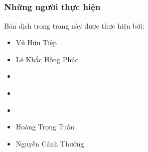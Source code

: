 \documentclass[letterpaper,11pt,english]{sphinxmanual}
\begin{document}
\subsection{}
\label{\detokenize{chapter_appendix_math/geometry-linear-algebric-ops_vn:id2}}


\begin{figure}[H]
\centering
\capstart

\noindent{}
\caption{}\label{\detokenize{chapter_appendix_math/geometry-linear-algebric-ops_vn:id12}}\end{figure}




\subsubsection{Những người thực hiện}
\label{\detokenize{chapter_appendix_math/geometry-linear-algebric-ops_vn:nhung-nguoi-thuc-hien}}
Bản dịch trong trang này được thực hiện bởi:


\begin{itemize}
\item {} 
Vũ Hữu Tiệp

\end{itemize}


\begin{itemize}
\item {} 
Lê Khắc Hồng Phúc

\end{itemize}


\begin{itemize}
\item {} 
\end{itemize}


\begin{itemize}
\item {} 
\end{itemize}


\begin{itemize}
\item {} 
\end{itemize}


\begin{itemize}
\item {} 
Hoàng Trọng Tuấn

\item {} 
Nguyễn Cảnh Thướng

\end{itemize}
\end{document}
